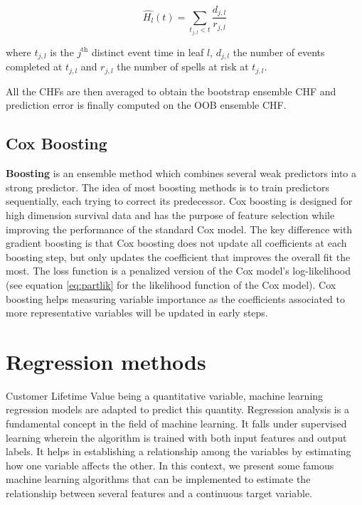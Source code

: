 \documentclass[
]{book}
\begin{document}
\begin{equation}
  \widehat{H_l}(t) = \sum_{t_{j, l} < t} \frac{d_{j,l}}{r_{j,l}}
  \label{eq:chf}
\end{equation}

where \(t_{j,l}\) is the \(j^{\text{th}}\) distinct event time in leaf \(l\), \(d_{j,l}\) the number of events completed at \(t_{j,l}\) and \(r_{j,l}\) the number of spells at risk at \(t_{j,l}\).

All the CHFs are then averaged to obtain the bootstrap ensemble CHF and prediction error is finally computed on the OOB ensemble CHF.

\hypertarget{cox-boosting}{%
\subsection{Cox Boosting}\label{cox-boosting}}

\textbf{Boosting} is an ensemble method which combines several weak predictors into a strong predictor. The idea of most boosting methods is to train predictors sequentially, each trying to correct its predecessor. Cox boosting \citep{COX_BOOSTING} is designed for high dimension survival data and has the purpose of feature selection while improving the performance of the standard Cox model. The key difference with gradient boosting is that Cox boosting does not update all coefficients at each boosting step, but only updates the coefficient that improves the overall fit the most. The loss function is a penalized version of the Cox model's log-likelihood (see equation \eqref{eq:partlik} for the likelihood function of the Cox model). Cox boosting helps measuring variable importance as the coefficients associated to more representative variables will be updated in early steps.

\hypertarget{regression-methods}{%
\section{Regression methods}\label{regression-methods}}

Customer Lifetime Value being a quantitative variable, machine learning regression models are adapted to predict this quantity. Regression analysis is a fundamental concept in the field of machine learning. It falls under supervised learning wherein the algorithm is trained with both input features and output labels. It helps in establishing a relationship among the variables by estimating how one variable affects the other. In this context, we present some famous machine learning algorithms that can be implemented to estimate the relationship between several features and a continuous target variable.
\end{document}
